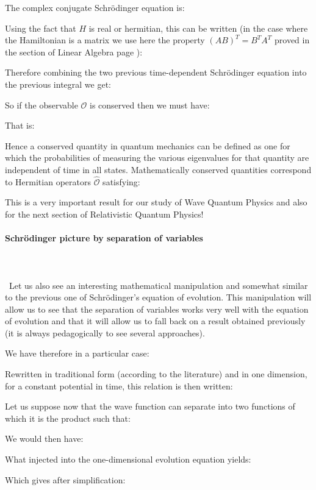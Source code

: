 	The complex conjugate Schrödinger equation is:
	
	Using the fact that $H$ is real or hermitian, this can be written (in the case where the Hamiltonian is a matrix we use here the property $(AB)^T=B^TA^T$ proved in the section of Linear Algebra page \pageref{transposed matrix}):
	
	Therefore combining the two previous time-dependent Schrödinger equation into the previous integral we get:
	
	So if the observable $\mathcal{O}$ is conserved then we must have:
	
	That is:
	
	Hence a conserved quantity in quantum mechanics can be defined as one for which the probabilities of measuring the various eigenvalues for that quantity are independent of time in all states. Mathematically conserved quantities correspond to Hermitian operators $\hat{\mathcal{O}}$ satisfying:
	
	This is a very important result for our study of Wave Quantum Physics and also for the next section of Relativistic Quantum Physics!
	
	\paragraph{Schrödinger picture by separation of variables}\mbox{}\\\\\
	Let us also see an interesting mathematical manipulation and somewhat similar to the previous one of Schrödinger's equation of evolution. This manipulation will allow us to see that the separation of variables works very well with the equation of evolution and that it will allow us to fall back on a result obtained previously (it is always pedagogically to see several approaches).

We have therefore in a particular case:
	
	Rewritten in traditional form (according to the literature) and in one dimension, for a constant potential in time, this relation is then written:
	
	Let us suppose now that the wave function can separate into two functions of which it is the product such that:
	
	We would then have:
	
	What injected into the one-dimensional evolution equation yields:
	
	Which gives after simplification:
	
